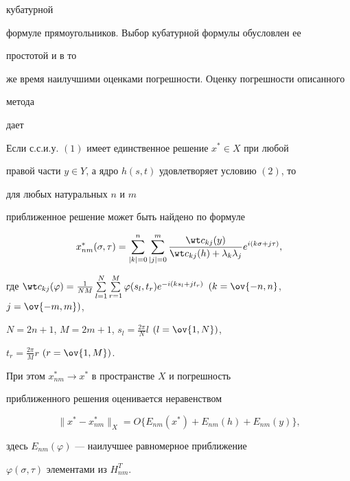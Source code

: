 кубатурной 


формуле прямоугольников. Выбор кубатурной формулы обусловлен ее 


простотой и в то 


же время наилучшими оценками погрешности. Оценку погрешности описанного 


метода 


дает 


 


\begin{thm} 


Если с.с.и.у. $(1)$ имеет единственное решение $x^*\in X$ при любой 


правой части $y\in Y$, а ядро $h(s,t)$ удовлетворяет условию $(2)$, то 


для любых натуральных $n$ и $m$ 


приближенное решение может быть найдено по формуле 


$$ 


x^*_{nm}(\sigma,\tau)=\sum^n_{|k|=0}\sum^m_{|j|=0} 


\frac{\wt c_{k j}(y)}{\wt c_{k j}(h)+\lambda_k\lambda_j} 


e^{i(k\sigma+j\tau)}, 


$$ 


где $\wt c_{k j}(\varphi)=\frac{1}{NM} 


\sum\limits^N_{l=1}\sum\limits^M_{r=1} 


\varphi(s_l,t_r)e^{-i(k s_l+j t_r)}$ $(k=\ov{-n,n}$, $j=\ov{-m,m})$, 


$N=2n+1$, $M=2m+1$, $s_l=\frac{2\pi}{N}l$ $(l=\ov{1,N})$, 


$t_r=\frac{2\pi}{M}r$ $(r=\ov{1,M})$. 


При этом $x^*_{nm}\to x^*$ в пространстве $X$ и погрешность 


приближенного решения оценивается неравенством 


$$ 


\|x^*-x^*_{nm}\|_X=O\{E_{nm}(x^*)+ 


E_{nm}(h)+E_{nm}(y)\}, 


$$ 


здесь $E_{nm}(\varphi)$ --- наилучшее равномерное приближение 


$\varphi(\sigma,\tau)$ элементами из $H^T_{nm}$. 


\end{thm} 


 


